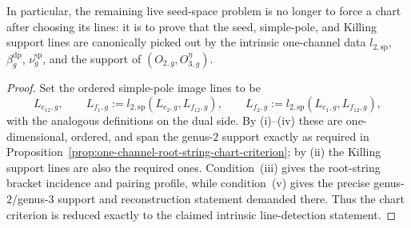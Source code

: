 \begin{proposition}
In particular, the remaining live seed-space problem is no longer to
force a chart after choosing its lines: it is to prove that the seed,
simple-pole, and Killing support lines are canonically picked out by the
intrinsic one-channel data
$l_{2,\mathrm{sp}}$, $\beta_g^{\mathrm{dp}}$,
$\nu_g^{\mathrm{sp}}$, and the support of
$(O_{2,g},O_{3,g}^\eta)$.
\end{proposition}

\begin{proof}
Set the ordered simple-pole image lines to be
\[
L_{e_{12},g},
\qquad
L_{f_1,g}:=l_{2,\mathrm{sp}}(L_{e_2,g},L_{f_{12},g}),
\qquad
L_{f_2,g}:=l_{2,\mathrm{sp}}(L_{e_1,g},L_{f_{12},g}),
\]
with the analogous definitions on the dual side.  By
\textup{(i)}--\textup{(iv)} these are one-dimensional, ordered, and
span the genus-$2$ support exactly as required in
Proposition~\ref{prop:one-channel-root-string-chart-criterion}; by
\textup{(ii)} the Killing support lines are also the required ones.
Condition~\textup{(iii)} gives the root-string bracket incidence and
pairing profile, while condition~\textup{(v)} gives the precise
genus-$2$/genus-$3$ support and reconstruction statement demanded
there.  Thus the chart criterion is reduced exactly to the claimed
intrinsic line-detection statement.
\end{proof}

